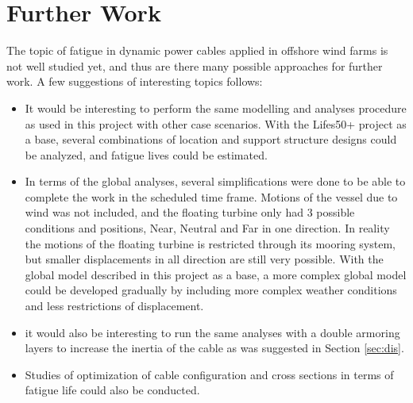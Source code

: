 \section{Further Work}
The topic of fatigue in dynamic power cables applied in offshore wind farms is not well studied yet, and thus are there many possible approaches for further work. A few suggestions of interesting topics follows:
\begin{itemize}
    \item It would be interesting to perform the same modelling and analyses procedure as used in this project with other case scenarios. With the Lifes50+ project as a base, several combinations of location and support structure designs could be analyzed, and fatigue lives could be estimated. 
    \item In terms of the global analyses, several simplifications were done to be able to complete the work in the scheduled time frame. Motions of the vessel due to wind was not included, and the floating turbine only had 3 possible conditions and positions, Near, Neutral and Far in one direction. In reality the motions of the floating turbine is restricted through its mooring system, but smaller displacements in all direction are still very possible. With the global model described in this project as a base, a more complex global model could be developed gradually by including more complex weather conditions and less restrictions of displacement.
    \item it would also be interesting to run the same analyses with a double armoring layers to increase the inertia of the cable as was suggested in Section \ref{sec:dis}. 
    \item Studies of optimization of cable configuration and cross sections in terms of fatigue life could also be conducted. 
\end{itemize}

  